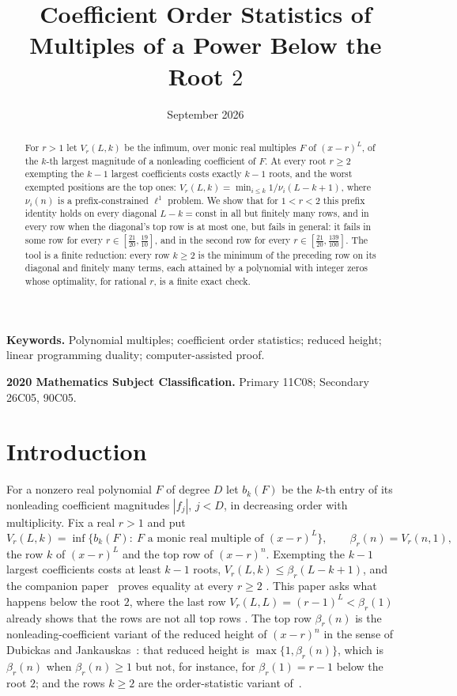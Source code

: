 \documentclass[11pt]{article}
\title{Coefficient Order Statistics of Multiples of a Power Below the Root $2$}
\author{\shortstack{Bangyen Pham\\
\small Independent Researcher\\
\small\href{mailto:bangyenp@gmail.com}{\texttt{bangyenp@gmail.com}}\\
\small\href{https://orcid.org/0009-0006-9928-2088}{ORCID: 0009-0006-9928-2088}}}
\date{September 2026}
\begin{document}
\maketitle

\begin{abstract}
For $r>1$ let $V_r(L,k)$ be the infimum, over monic real multiples $F$ of
$(x-r)^L$, of the $k$-th largest magnitude of a nonleading coefficient of
$F$.  At every root $r\ge2$ exempting the $k-1$ largest coefficients costs
exactly $k-1$ roots, and the worst exempted positions are the top ones:
$V_r(L,k)=\min_{i\le k}1/\nu_i(L-k+1)$, where $\nu_i(n)$ is a
prefix-constrained $\ell^1$ problem.  We show that for $1<r<2$ this prefix
identity holds on every diagonal $L-k=\mathrm{const}$ in all but finitely
many rows, and in every row when the diagonal's top row is at most one,
but fails in general: it fails in some row for every
$r\in[\frac{21}{20},\frac{19}{10}]$, and in the second row for every
$r\in[\frac{21}{20},\frac{139}{100}]$.  The tool is a finite reduction:
every row $k\ge2$ is the minimum of the preceding row on its diagonal and
finitely many terms, each attained by a polynomial with integer zeros whose
optimality, for rational $r$, is a finite exact check.
\end{abstract}

\noindent\textbf{Keywords.} Polynomial multiples; coefficient order
statistics; reduced height; linear programming duality; computer-assisted
proof.

\noindent\textbf{2020 Mathematics Subject Classification.} Primary 11C08; Secondary 26C05, 90C05.

\section{Introduction}\label{sec:intro}

For a nonzero real polynomial $F$ of degree $D$ let $b_k(F)$ be the
$k$-th entry of its nonleading coefficient magnitudes $|f_j|$, $j<D$, in
decreasing order with multiplicity.  Fix a real $r>1$ and put
\[
  V_r(L,k)=\inf\{b_k(F):\ F\text{ a monic real multiple of }(x-r)^L\},
  \qquad \beta_r(n)=V_r(n,1),
\]
the row $k$ of $(x-r)^L$ and the top row of $(x-r)^n$.  Exempting the
$k-1$ largest coefficients costs at least $k-1$ roots,
$V_r(L,k)\le\beta_r(L-k+1)$, and the companion
paper~\cite{coefficient-mass-rows} proves equality at every $r\ge2$
\cite[Theorem~5.3]{coefficient-mass-rows}.  This paper asks what happens
below the root $2$, where the last row
$V_r(L,L)=(r-1)^L<\beta_r(1)$ already shows that the rows are not all top
rows \cite[Corollary~2.4]{coefficient-mass-rows}.  The top row
$\beta_r(n)$ is the nonleading-coefficient variant of the reduced height of
$(x-r)^n$ in the sense of Dubickas and Jankauskas~\cite{dj}: that reduced
height is $\max\{1,\beta_r(n)\}$, which is $\beta_r(n)$ when
$\beta_r(n)\ge1$ but not, for instance, for $\beta_r(1)=r-1$ below the
root $2$; and the rows $k\ge2$ are the order-statistic
variant of~\cite{coefficient-mass}.
\end{document}

